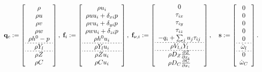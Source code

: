 \begin{equation}\label{eq:gemsGovVecs}
    \consVec \defEq \left[
    \begin{array}{c}
    \density \\
	\density \velX \\
	\density \velY \\
	\density \velZ \\
	\density \stagEnth - \pressure \\ \hdashline[2pt/2pt]
	\density \mfSpec \\ \hdashline[2pt/2pt]
	\density \mixFrac \\
	\density \progVar
    \end{array}
    \right] , \;
    \invFluxDir \defEq \left[
    \begin{array}{c}
    \density \vel_{\spatialIdx} \\
	\density \velX \vel_{\spatialIdx} + \delta_{x \spatialIdx} \pressure \\
	\density \velY \vel_{\spatialIdx} + \delta_{y \spatialIdx} \pressure \\
	\density \velZ \vel_{\spatialIdx} + \delta_{z \spatialIdx} \pressure \\
	\density \stagEnth \vel_{\spatialIdx} \\ \hdashline[2pt/2pt]
	\density \mfSpec \vel_{\spatialIdx} \\ \hdashline[2pt/2pt]
	\density \mixFrac \vel_{\spatialIdx} \\
	\density \progVar \vel_{\spatialIdx}
    \end{array}
    \right] , \;
	\viscFluxDir \defEq \left[
    \begin{array}{c}
    0 \\
	\shearStress_{\spatialIdx x} \\
	\shearStress_{\spatialIdx y} \\
	\shearStress_{\spatialIdx z} \\
	- \heatFlux_{\spatialIdx} + \sum_{\spatialIdxTwo} \vel_{\spatialIdxTwo} \shearStress_{\spatialIdx \spatialIdxTwo}\\ \hdashline[2pt/2pt]
	\density \diffusionVelSpecDir \mfSpec \\ \hdashline[2pt/2pt]
	\density \massDiffMixFrac \pde{\mixFrac}{x_{\spatialIdx}} \\
	\density \massDiffProgVar \pde{\progVar}{x_{\spatialIdx}}
    \end{array}
    \right], \quad
	\sourceVec \defEq \left[
    \begin{array}{c}
    0 \\
	0 \\
	0 \\
	0 \\
	0 \\ \hdashline[2pt/2pt]
	\prodRateSpecFR \\ \hdashline[2pt/2pt]
	0 \\
	\prodRateFPV
    \end{array} \right].
\end{equation}
